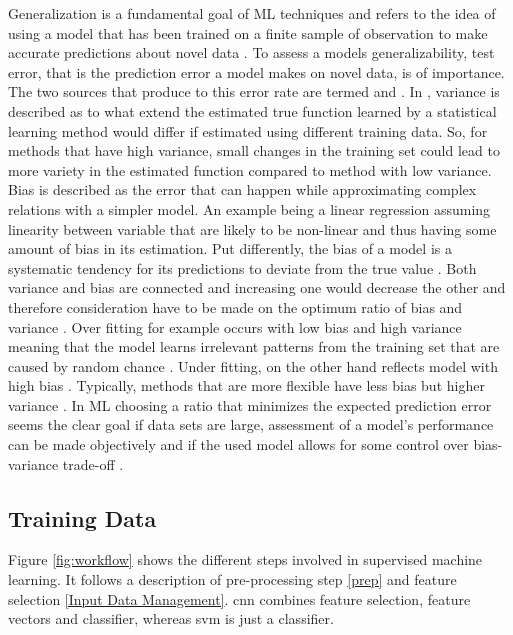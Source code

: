 Generalization is a fundamental goal of \gls{ML} techniques and refers to the idea of using a model that has been trained on a finite sample of observation to make accurate predictions about novel data \autocite{foundationof}. To assess a models generalizability, test error, that is the prediction error a model makes on novel data, is of importance. The two sources that produce to this error rate are termed  and  \autocite{westfall}. 
In \textcite{introtostat}, variance is described as to what extend the estimated true function learned by a statistical learning method would differ if estimated using different training data. So, for methods that have high variance, small changes in the training set could lead to more variety in the estimated function compared to method with low variance. Bias is described as the error that can happen while approximating complex relations with a simpler model. An example being a linear regression assuming linearity between variable that are likely to be non-linear and thus having some amount of bias in its estimation. Put differently, the bias of a model is a systematic tendency for its predictions to deviate from the true value \autocite{westfall}. Both variance and bias are connected and increasing one would decrease the other and therefore consideration have to be made on the optimum ratio of bias and variance \autocite{introtostat}. Over fitting for example occurs with low bias and high variance meaning that the model learns irrelevant patterns from the training set that are caused by random chance \autocite{introtostat}. Under fitting, on the other hand reflects model with high bias \autocite{deeplearningav}. Typically, methods that are more flexible have less bias but higher variance \autocite{introtostat}. 
In \gls{ML} choosing a ratio that minimizes the expected prediction error seems the clear goal if data sets are large, assessment of a model's performance can be made objectively and if the used model allows for some control over bias-variance trade-off \autocite{westfall}. 







\subsection{Training Data} \label{Training Data}
Figure \ref{fig:workflow} shows the different steps involved in supervised machine learning. It follows a description of pre-processing step \ref{prep} and feature selection \ref{Input Data Management}. \gls{cnn} combines feature selection, feature vectors and classifier, whereas \gls{svm} is just a classifier. 

